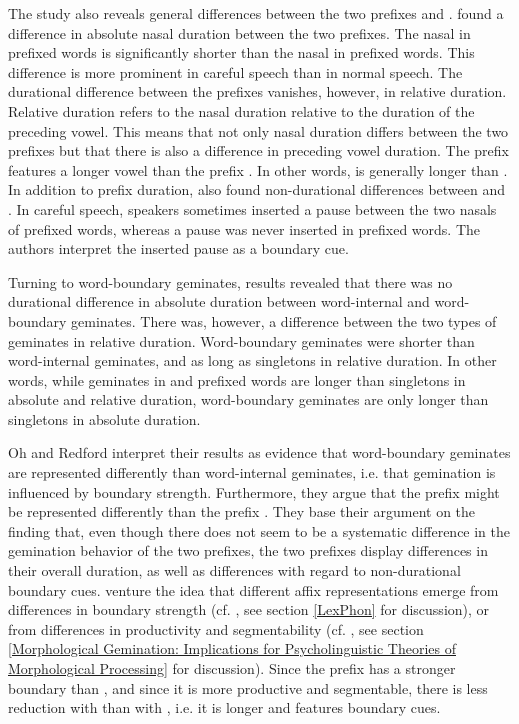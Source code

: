 The study also reveals general differences between the two prefixes  and . \cite{Oh.2012} found a difference in absolute nasal duration between the two prefixes. The nasal in prefixed words is significantly shorter than the nasal in prefixed words. This difference is more prominent in careful speech than in normal speech. The durational difference between the prefixes vanishes, however, in relative duration. Relative duration refers to the nasal duration relative to the duration of the preceding vowel. This means that not only nasal duration differs between the two prefixes but that there is also a difference in preceding vowel duration. The prefix  features a longer vowel than the prefix .  In other words,  is generally longer than . In addition to prefix duration, \cite{Oh.2012}
also found non-durational differences between  and . In careful speech, speakers sometimes inserted a pause between the two nasals of prefixed words, whereas a pause was never inserted in prefixed words. The authors interpret the inserted pause as a boundary cue.

Turning to word-boundary geminates,  results revealed that there was no durational difference in absolute duration between word-internal and word-boundary geminates. There was, however, a difference between the two types of geminates in relative duration. Word-boundary geminates were shorter than word-internal geminates, and as long as singletons in relative duration. In other words, while geminates in  and prefixed words are longer than singletons in absolute and relative duration, word-boundary geminates are only longer than singletons in absolute duration.


Oh and Redford interpret their results as evidence that word-boundary geminates are represented differently than word-internal geminates, i.e. that gemination is influenced by boundary strength.  Furthermore, they argue that the prefix  might be represented differently than the prefix . They base their argument on the finding that, even though there does not seem to be a systematic difference in the gemination behavior of the two prefixes, the two prefixes display differences in their overall duration, as well as differences with regard to non-durational boundary cues. \cite{Oh.2012} venture the idea that different affix representations emerge from differences in boundary strength (cf. \citealt{Kiparsky.1982,Mohanan.1986}, see section \ref{LexPhon} for discussion), or from differences in productivity and segmentability (cf. \citealt{Hay.2003}, see section \ref{Morphological Gemination: Implications for Psycholinguistic Theories of Morphological Processing} for discussion). Since the prefix  has a stronger boundary than , and since it is more productive and segmentable, there is less reduction with  than with , i.e. it is longer and features boundary cues.


